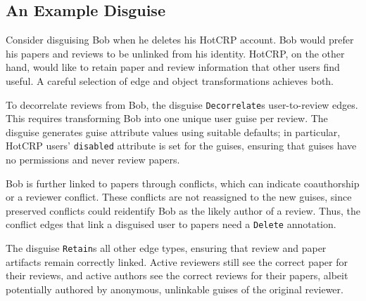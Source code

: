 %

\subsection{An Example Disguise}
\label{design:eg}
%
Consider disguising Bob when he deletes his HotCRP account.
%
Bob would prefer his papers and reviews to be unlinked from his identity.
%
HotCRP, on the other hand, would like to retain paper and review information that other users
find useful.
%
A careful selection of edge and object transformations achieves both.
%

%
To decorrelate reviews from Bob, the disguise \texttt{Decorrelate}s user-to-review edges.
%
This requires transforming Bob into one unique user guise per review.
%
The disguise generates guise attribute values using suitable defaults;
%
in particular, HotCRP users' \texttt{disabled} attribute is set for the guises,
ensuring that guises have no permissions and never review papers.
%

%
Bob is further linked to papers through conflicts, which can indicate coauthorship or a
reviewer conflict.
%
These conflicts are not reassigned to the new guises, since preserved
conflicts could reidentify Bob as the likely author of a review. Thus, the
conflict edges that link a disguised user to papers need a \texttt{Delete} annotation.
%

The disguise \texttt{Retain}s all other edge types, ensuring that review and paper
artifacts remain correctly linked. Active reviewers still see the correct paper for their reviews,
and active authors see the correct reviews for their papers, albeit potentially authored by
anonymous, unlinkable guises of the original reviewer.
%
%

